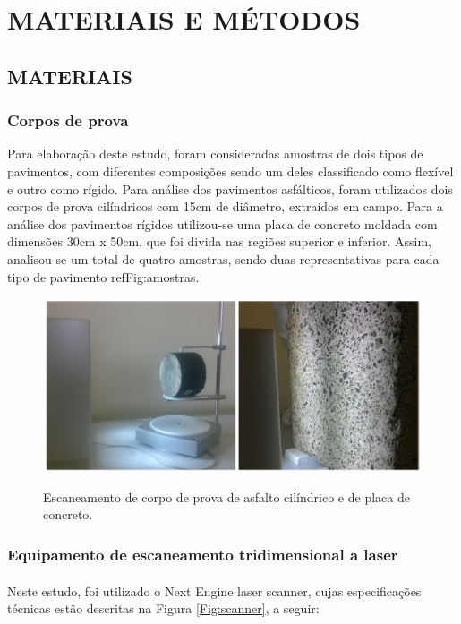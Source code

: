 \chapter{MATERIAIS E MÉTODOS}\label{CAP3}

\section{MATERIAIS}

\subsection{Corpos de prova}
Para elaboração deste estudo, foram consideradas amostras de dois tipos de pavimentos, com diferentes composições sendo um deles classificado como flexível e outro como rígido. Para análise dos pavimentos asfálticos, foram utilizados dois corpos de prova cilíndricos com 15cm de diâmetro, extraídos em campo. Para a análise dos pavimentos rígidos utilizou-se uma placa de concreto moldada com dimensões 30cm x 50cm, que foi divida nas regiões superior e inferior. Assim, analisou-se um total de quatro amostras, sendo duas representativas para cada tipo de pavimento ref{Fig:amostras}.

\begin{figure}[!ht]
\centering
{\includegraphics[scale=0.35]{figures/cps.jpg}}\\
\caption{Escaneamento de corpo de prova de asfalto cilíndrico e de placa de concreto.} 
\label{Fig:amostras}
\end{figure}

\subsection{Equipamento de escaneamento tridimensional a laser}
Neste estudo, foi utilizado o Next Engine\textsuperscript{\textregistered} laser scanner, cujas especificações técnicas estão descritas na Figura \ref{Fig:scanner}, a seguir:


